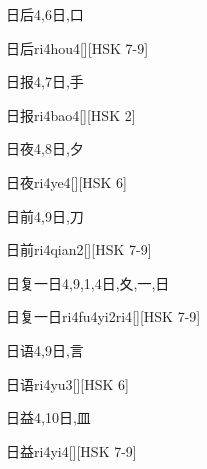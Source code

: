 \begin{Entry}{日后}{4,6}{⽇,⼝}
  \begin{Phonetics}{日后}{ri4hou4}[][HSK 7-9]
  \end{Phonetics}
\end{Entry}

\begin{Entry}{日报}{4,7}{⽇,⼿}
  \begin{Phonetics}{日报}{ri4bao4}[][HSK 2]
  \end{Phonetics}
\end{Entry}

\begin{Entry}{日夜}{4,8}{⽇,⼣}
  \begin{Phonetics}{日夜}{ri4ye4}[][HSK 6]
  \end{Phonetics}
\end{Entry}

\begin{Entry}{日前}{4,9}{⽇,⼑}
  \begin{Phonetics}{日前}{ri4qian2}[][HSK 7-9]
  \end{Phonetics}
\end{Entry}

\begin{Entry}{日复一日}{4,9,1,4}{⽇,⼢,⼀,⽇}
  \begin{Phonetics}{日复一日}{ri4fu4yi2ri4}[][HSK 7-9]
  \end{Phonetics}
\end{Entry}

\begin{Entry}{日语}{4,9}{⽇,⾔}
  \begin{Phonetics}{日语}{ri4yu3}[][HSK 6]
  \end{Phonetics}
\end{Entry}

\begin{Entry}{日益}{4,10}{⽇,⽫}
  \begin{Phonetics}{日益}{ri4yi4}[][HSK 7-9]
  \end{Phonetics}
\end{Entry}

